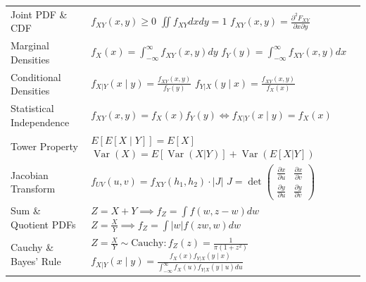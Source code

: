 \documentclass[12pt,a4paper]{article}
\renewcommand{\arraystretch}{1.45}
\begin{document}
\begin{tcolorbox}[formulabox, title={\textbf{Key Formulas and Bivariate Relations at a Glance}}]
\renewcommand{\arraystretch}{1.35}
\setlength{\tabcolsep}{5pt}
\noindent\begin{tabularx}{\linewidth}{B{3.5cm} Y}
Joint PDF \& CDF & $f_{XY}(x,y) \ge 0$ \newline $\iint f_{XY} dx dy = 1$ \newline $f_{XY}(x,y) = \frac{\partial^2 F_{XY}}{\partial x \partial y}$ \\[3pt]
Marginal Densities & $f_X(x) = \int_{-\infty}^\infty f_{XY}(x,y) dy$ \newline $f_Y(y) = \int_{-\infty}^\infty f_{XY}(x,y) dx$ \\[3pt]
Conditional Densities & $f_{X|Y}(x \mid y) = \frac{f_{XY}(x,y)}{f_Y(y)}$ \newline $f_{Y|X}(y \mid x) = \frac{f_{XY}(x,y)}{f_X(x)}$ \\[3pt]
Statistical Independence & $f_{XY}(x,y) = f_X(x) f_Y(y) \iff f_{X|Y}(x \mid y) = f_X(x)$ \\[3pt]
Tower Property & $E\left[E[X \mid Y]\right] = E[X]$ \newline $\operatorname{Var}(X) = E[\operatorname{Var}(X|Y)] + \operatorname{Var}(E[X|Y])$ \\[3pt]
Jacobian Transform & $f_{UV}(u,v) = f_{XY}(h_1, h_2) \cdot |J|$ \newline $J = \det \begin{pmatrix} \frac{\partial x}{\partial u} & \frac{\partial x}{\partial v} \\ \frac{\partial y}{\partial u} & \frac{\partial y}{\partial v} \end{pmatrix}$ \\[3pt]
Sum \& Quotient PDFs & $Z = X+Y \implies f_Z = \int f(w, z-w) dw$ \newline $Z = \frac{X}{Y} \implies f_Z = \int |w| f(zw, w) dw$ \\[3pt]
Cauchy \& Bayes' Rule & $Z = \frac{X}{Y} \sim \text{Cauchy}: f_Z(z) = \frac{1}{\pi(1+z^2)}$ \newline $f_{X|Y}(x \mid y) = \frac{f_X(x) f_{Y|X}(y \mid x)}{\int_{-\infty}^\infty f_X(u) f_{Y|X}(y \mid u) du}$ \\[3pt]
\end{tabularx}\par
\end{tcolorbox}

\vspace{1pt}
\end{document}
